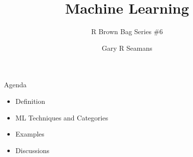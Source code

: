 \documentclass[11pt]{beamer}
\begin{document}
	\author{Gary R Seamans}
	\title{Machine Learning}
	\subtitle{R Brown Bag Series \#6}
	\begin{frame}[plain]
		\maketitle
    \end{frame}

\begin{frame}{
	\begin{minipage}[t]{0.55\textwidth}
		Agenda
	\end{minipage}
	\hfill
	\begin{minipage}[t]{0.35\textwidth}
		\flushright
	\end{minipage}
}{}
\begin{center}
	\begin{itemize}
		\item Definition
		\item ML Techniques and Categories
		\item Examples
		\item Discussions
	\end{itemize}
\end{center}
\end{frame}
\end{document}
